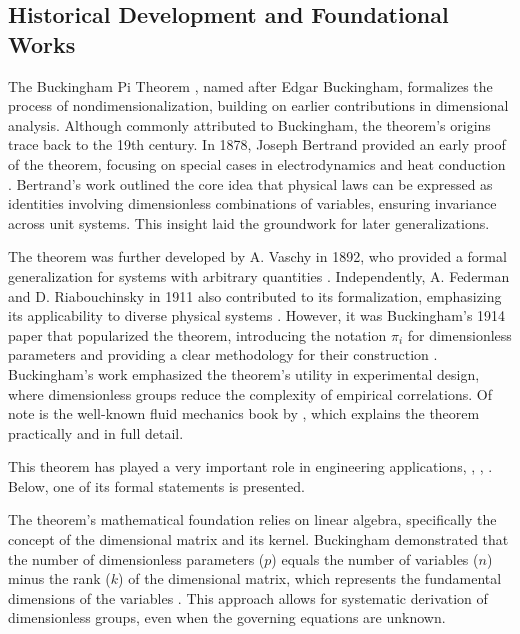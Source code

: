 \documentclass[
	11pt, %
	fleqn, %
	a4paper, %
]{LegrandOrangeBook}
\begin{document}
\subsection{Historical Development and Foundational Works}

The Buckingham Pi Theorem \cite{buckingham1914}, named after Edgar Buckingham, formalizes the process of nondimensionalization, building on earlier contributions in dimensional analysis. Although commonly attributed to Buckingham, the theorem's origins trace back to the 19th century. In 1878, Joseph Bertrand provided an early proof of the theorem, focusing on special cases in electrodynamics and heat conduction \cite{Bertrand1878}. Bertrand's work outlined the core idea that physical laws can be expressed as identities involving dimensionless combinations of variables, ensuring invariance across unit systems. This insight laid the groundwork for later generalizations.

The theorem was further developed by A. Vaschy in 1892, who provided a formal generalization for systems with arbitrary quantities \cite{vaschy1892}. Independently, A. Federman and D. Riabouchinsky in 1911 also contributed to its formalization, emphasizing its applicability to diverse physical systems \cite{Federman1911, Riabouchinsky1911}. However, it was Buckingham's 1914 paper that popularized the theorem, introducing the notation \(\pi_i\) for dimensionless parameters and providing a clear methodology for their construction \cite{buckingham1914}. Buckingham's work emphasized the theorem's utility in experimental design, where dimensionless groups reduce the complexity of empirical correlations. Of note is the well-known fluid mechanics book by \cite{white2011}, which explains the theorem practically and in full detail.




This theorem has played a very important role in engineering applications, \cite{azagra2010teorema}, \cite{azagra2012metafisica}, \cite{azagra2015generalizaciones}. Below, one of its formal statements is presented.



The theorem's mathematical foundation relies on linear algebra, specifically the concept of the dimensional matrix and its kernel. Buckingham demonstrated that the number of dimensionless parameters (\( p \)) equals the number of variables (\( n \)) minus the rank (\( k \)) of the dimensional matrix, which represents the fundamental dimensions of the variables \cite{buckingham1914}. This approach allows for systematic derivation of dimensionless groups, even when the governing equations are unknown.
\end{document}
